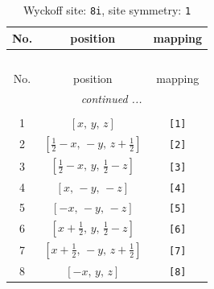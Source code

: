 \documentclass[fleqn,8pt]{jsarticle}
\begin{document}
\renewcommand{\arraystretch}{1.2}
\begin{longtable}{ccc}
\caption{Wyckoff site: {\tt 8i}, site symmetry: {\tt 1}}
 \\
 \hline \hline
No. & position & mapping \\ \hline \endfirsthead

\multicolumn{2}{l}{\tablename\ \thetable{}} \\
 \hline \hline
No. & position & mapping \\ \hline \endhead

 \hline \hline
\multicolumn{2}{r}{\footnotesize\it continued ...} \\ \endfoot

 \hline \hline
\multicolumn{2}{r}{} \\ \endlastfoot

1 & $\left[ x,\, y,\, z \right]$ & {\tt [1]} \\ \hline
2 & $\left[ \frac{1}{2} - x,\, - y,\, z + \frac{1}{2} \right]$ & {\tt [2]} \\ \hline
3 & $\left[ \frac{1}{2} - x,\, y,\, \frac{1}{2} - z \right]$ & {\tt [3]} \\ \hline
4 & $\left[ x,\, - y,\, - z \right]$ & {\tt [4]} \\ \hline
5 & $\left[ - x,\, - y,\, - z \right]$ & {\tt [5]} \\ \hline
6 & $\left[ x + \frac{1}{2},\, y,\, \frac{1}{2} - z \right]$ & {\tt [6]} \\ \hline
7 & $\left[ x + \frac{1}{2},\, - y,\, z + \frac{1}{2} \right]$ & {\tt [7]} \\ \hline
8 & $\left[ - x,\, y,\, z \right]$ & {\tt [8]} \\
\end{longtable}
\end{document}
